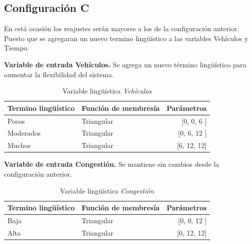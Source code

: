 \pagebreak
\subsection{Configuración C}
En está ocasión los reajustes serán mayores a los de la configuración anterior. Puesto que se agregaran un nuevo termino lingüístico a las variables Vehículos y Tiempo.

\textbf{Variable de entrada Vehículos.} Se agrega un nuevo término lingüístico para aumentar la flexibilidad del sistema.

\begin{table}[!h]
	\centering
	\begin{tabular}{llr} \toprule
		Termino lingüístico & Función de membresía & Parámetros \\ \midrule
		Pocos & Triangular & [0, 0, 6 ] \\
		Moderados & Triangular & [0, 6, 12 ] \\
		Muchos & Triangular & [6, 12, 12] \\ \bottomrule
	\end{tabular}
	\caption{Variable lingüística \textit{Vehículos}}
\end{table}


\textbf{Variable de entrada Congestión.} Se mantiene sin cambios desde la configuración anterior.


\begin{table}[!h]
	\centering
	\begin{tabular}{llr} \toprule
		Termino lingüístico & Función de membresía & Parámetros \\ \midrule
		Baja & Triangular & [0, 0, 12 ] \\
		Alta & Triangular & [0, 12, 12] \\ \bottomrule
	\end{tabular}
	\caption{Variable lingüística \textit{Congestión}}
\end{table}


